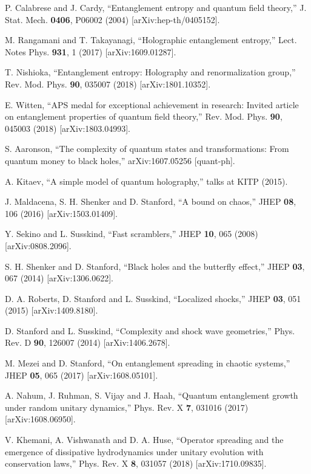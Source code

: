 \documentclass[11pt,letterpaper]{article}
\begin{document}
\begin{thebibliography}{99}
P. Calabrese and J. Cardy, ``Entanglement entropy and quantum field theory,''
J. Stat. Mech. \textbf{0406}, P06002 (2004) [arXiv:hep-th/0405152].

M. Rangamani and T. Takayanagi, ``Holographic entanglement entropy,''
Lect. Notes Phys. \textbf{931}, 1 (2017) [arXiv:1609.01287].

T. Nishioka, ``Entanglement entropy: Holography and renormalization group,''
Rev. Mod. Phys. \textbf{90}, 035007 (2018) [arXiv:1801.10352].

E. Witten, ``APS medal for exceptional achievement in research: Invited article on entanglement properties of quantum field theory,''
Rev. Mod. Phys. \textbf{90}, 045003 (2018) [arXiv:1803.04993].

S. Aaronson, ``The complexity of quantum states and transformations: From quantum money to black holes,''
arXiv:1607.05256 [quant-ph].

A. Kitaev, ``A simple model of quantum holography,'' talks at KITP (2015).

J. Maldacena, S. H. Shenker and D. Stanford, ``A bound on chaos,''
JHEP \textbf{08}, 106 (2016) [arXiv:1503.01409].

Y. Sekino and L. Susskind, ``Fast scramblers,''
JHEP \textbf{10}, 065 (2008) [arXiv:0808.2096].

S. H. Shenker and D. Stanford, ``Black holes and the butterfly effect,''
JHEP \textbf{03}, 067 (2014) [arXiv:1306.0622].

D. A. Roberts, D. Stanford and L. Susskind, ``Localized shocks,''
JHEP \textbf{03}, 051 (2015) [arXiv:1409.8180].

D. Stanford and L. Susskind, ``Complexity and shock wave geometries,''
Phys. Rev. D \textbf{90}, 126007 (2014) [arXiv:1406.2678].

M. Mezei and D. Stanford, ``On entanglement spreading in chaotic systems,''
JHEP \textbf{05}, 065 (2017) [arXiv:1608.05101].

A. Nahum, J. Ruhman, S. Vijay and J. Haah, ``Quantum entanglement growth under random unitary dynamics,''
Phys. Rev. X \textbf{7}, 031016 (2017) [arXiv:1608.06950].

V. Khemani, A. Vishwanath and D. A. Huse, ``Operator spreading and the emergence of dissipative hydrodynamics under unitary evolution with conservation laws,''
Phys. Rev. X \textbf{8}, 031057 (2018) [arXiv:1710.09835].


\end{thebibliography}
\end{document}
